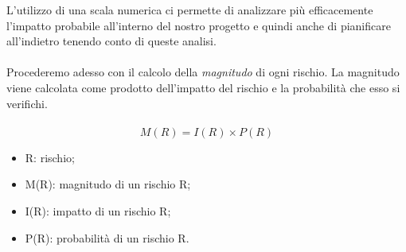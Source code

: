 	L’utilizzo di una scala numerica ci permette di analizzare più efficacemente l’impatto probabile all’interno del nostro progetto e quindi anche di pianificare all’indietro tenendo conto di queste analisi. \\ \\ Procederemo adesso con il calcolo della \textit{magnitudo} di ogni rischio.
	La magnitudo viene calcolata come prodotto dell'impatto del rischio e la probabilità che esso si verifichi. \\ \\
	\begin{equation}
        	M(R)= I(R) \times P(R) 
    	\end{equation}
	
	\begin{itemize}
	    \item R: rischio;
	    \item M(R): magnitudo di un rischio R;
	    \item I(R): impatto di un rischio R;
	    \item P(R): probabilità di un rischio R.
	\end{itemize}
	
